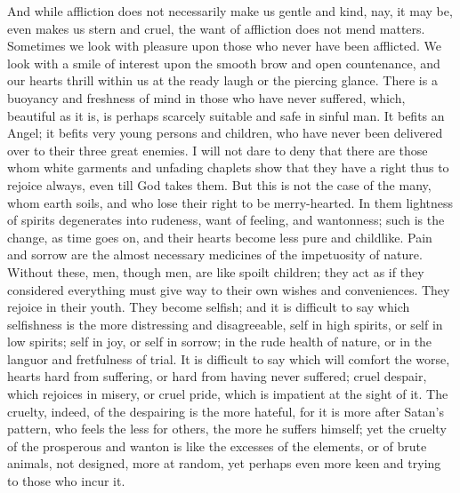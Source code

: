 And while affliction does not necessarily make us gentle and kind,
nay, it may be, even makes us stern and cruel, the want of affliction
does not mend matters. Sometimes we look with pleasure upon those who
never have been afflicted. We look with a smile of interest upon the
smooth brow and open countenance, and our hearts thrill within us at
the ready laugh or the piercing glance. There is a buoyancy and
freshness of mind in those who have never suffered, which, beautiful
as it is, is perhaps scarcely suitable and safe in sinful man. It
befits an Angel; it befits very young persons and children, who have
never been delivered over to their three great enemies. I will not
dare to deny that there are those whom white garments and unfading
chaplets show that they have a right thus to rejoice always, even till
God takes them. But this is not the case of the many, whom earth
soils, and who lose their right to be merry-hearted. In them lightness
of spirits degenerates into rudeness, want of feeling, and wantonness;
such is the change, as time goes on, and their hearts become less pure
and childlike. Pain and sorrow are the almost necessary medicines of
the impetuosity of nature. Without these, men, though men, are like
spoilt children; they act as if they considered everything must give
way to their own wishes and conveniences. They rejoice in their youth.
They become selfish; and it is difficult to say which selfishness is
the more distressing and disagreeable, self in high spirits, or self
in low spirits; self in joy, or self in sorrow; in the rude health of
nature, or in the languor and fretfulness of trial. It is difficult to
say which will comfort the worse, hearts hard from suffering, or hard
from having never suffered; cruel despair, which rejoices in misery,
or cruel pride, which is impatient at the sight of it. The cruelty,
indeed, of the despairing is the more hateful, for it is more after
Satan's pattern, who feels the less for others, the more he suffers
himself; yet the cruelty of the prosperous and wanton is like the
excesses of the elements, or of brute animals, not designed, more at
random, yet perhaps even more keen and trying to those who incur it.

